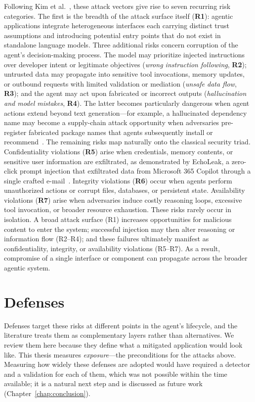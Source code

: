 Following Kim et al.~\cite{kim2026sok}, these attack vectors give rise to seven recurring risk categories. The first is the breadth of the attack surface itself (\textbf{R1}): agentic applications integrate heterogeneous interfaces each carrying distinct trust assumptions and introducing potential entry points that do not exist in standalone language models.
Three additional risks concern corruption of the agent's decision-making process. The model may prioritize injected instructions over developer intent or legitimate objectives (\emph{wrong instruction following}, \textbf{R2}); untrusted data may propagate into sensitive tool invocations, memory updates, or outbound requests with limited validation or mediation (\emph{unsafe data flow}, \textbf{R3}); and the agent may act upon fabricated or incorrect outputs (\emph{hallucination and model mistakes}, \textbf{R4}). The latter becomes particularly dangerous when agent actions extend beyond text generation—for example, a hallucinated dependency name may become a supply-chain attack opportunity when adversaries pre-register fabricated package names that agents subsequently install or recommend~\cite{spracklen}.
The remaining risks map naturally onto the classical security triad. Confidentiality violations (\textbf{R5}) arise when credentials, memory contents, or sensitive user information are exfiltrated, as demonstrated by EchoLeak, a zero-click prompt injection that exfiltrated data from Microsoft 365 Copilot through a single crafted e-mail~\cite{echoleak}. Integrity violations (\textbf{R6}) occur when agents perform unauthorized actions or corrupt files, databases, or persistent state. Availability violations (\textbf{R7}) arise when adversaries induce costly reasoning loops, excessive tool invocation, or broader resource exhaustion.
These risks rarely occur in isolation. A broad attack surface (R1) increases opportunities for malicious content to enter the system; successful injection may then alter reasoning or information flow (R2--R4); and these failures ultimately manifest as confidentiality, integrity, or availability violations (R5--R7). As a result, compromise of a single interface or component can propagate across the broader agentic system.

\section{Defenses}
\label{sec:defenses}

Defenses target these risks at different points in the agent's lifecycle, and the literature treats them as complementary layers rather than alternatives. We review them here because they define what a mitigated application would look like. This thesis measures \emph{exposure}---the preconditions for the attacks above. Measuring how widely these defenses are adopted would have required a detector and a validation for each of them, which was not possible within the time available; it is a natural next step and is discussed as future work (Chapter~\ref{chap:conclusion}).

